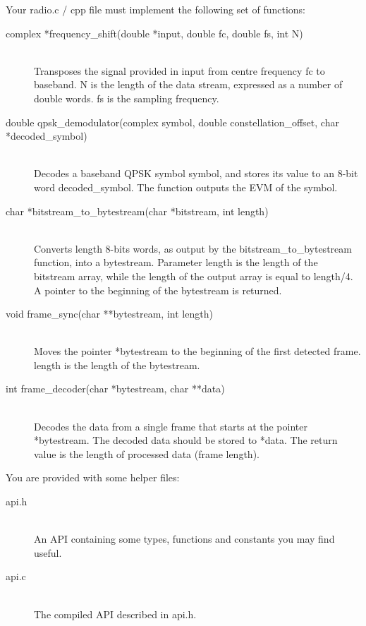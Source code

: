 \documentclass[openany]{book}
\begin{document}
	Your \textsf{radio.c / cpp} file must implement the following set of 
	functions:
	\begin{description}
		\item[complex *frequency\_shift(double *input, double fc, double fs, 
		int N)]
		\,\\ Transposes the signal provided in input from centre frequency 
		\textsf{fc} to baseband. \textsf{N} is the length of the data stream, 
		expressed as a number of double words. \textsf{fs} is the sampling 
		frequency.
		\item[double qpsk\_demodulator(complex symbol, double 
		constellation\_offset, char *decoded\_symbol)]
		\,\\ Decodes a baseband QPSK symbol \textsf{symbol}, and stores its 
		value to an 8-bit word \textsf{decoded\_symbol}. The function outputs 
		the EVM of the symbol.
		\item[char *bitstream\_to\_bytestream(char *bitstream, int length)]
		\,\\ Converts \textsf{length} 8-bits words, as output by the 
		\textsf{bitstream\_to\_bytestream} function, into a bytestream. 
		Parameter \textsf{length} is the length of the bitstream array, while 
		the length of the output array is equal to \textsf{length}/4. A pointer 
		to the beginning of the bytestream is returned.
		\item[void frame\_sync(char **bytestream, int length)]
		\,\\ Moves the pointer \textsf{*bytestream} to the beginning of the 
		first detected frame. \textsf{length} is the length of the bytestream.
		\item[int frame\_decoder(char *bytestream, char **data)]
		\,\\ Decodes the data from a single frame that starts at the pointer 
		\textsf{*bytestream}. The decoded data should be stored to 
		\textsf{*data}. The return value is the length of processed data (frame 
		length).
	\end{description}
	
	You are provided with some helper files:
	\begin{description}
		\item[api.h]
		\,\\ An API containing some types, functions and constants you may find 
		useful.
		\item[api.c]
		\,\\ The compiled API described in \textsf{api.h}.
	\end{description}
	
\end{document}
